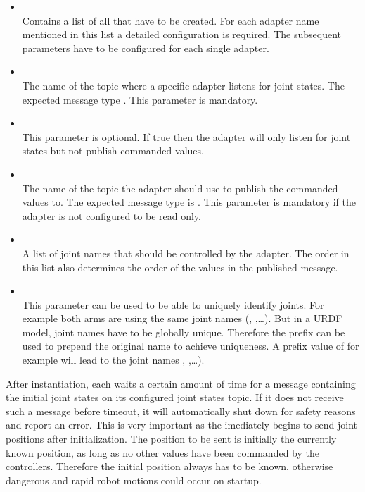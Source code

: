 \begin{itemize}

\item \textbf{} \\
Contains a list of all  that have to be created. For each adapter name mentioned in this list a detailed configuration is required. The subsequent parameters have to be configured for each single adapter.

\item \textbf{} \\
The name of the topic where a specific adapter listens for joint states. The expected message type  . This parameter is mandatory.

\item \textbf{} \\
This parameter is optional. If true then the adapter will only listen for joint states but not publish commanded values.

\item \textbf{} \\
The name of the topic the adapter should use to publish the commanded values to. The expected message type is . This parameter is mandatory if the adapter is not configured to be read only.

\item \textbf{} \\
A list of joint names that should be controlled by the adapter. The order in this list also determines the order of the values in the published message.

\item \textbf{} \\
This parameter can be used to be able to uniquely identify joints. For example both arms are using the same joint names (, ,\ldots). But in a URDF model, joint names have to be globally unique. Therefore the prefix can be used to prepend the original name to achieve uniqueness. A prefix value of  for example will lead to the joint names , ,\ldots).

\end{itemize}

After instantiation, each  waits a certain amount of time for a message containing the initial joint states on its configured joint states topic. If it does not receive such a message before timeout, it will automatically shut down for safety reasons and report an error. This is very important as the  imediately begins to send joint positions after initialization. The position to be sent is initially the currently known position, as long as no other values have been commanded by the controllers. Therefore the initial position always has to be known, otherwise dangerous and rapid robot motions could occur on startup.

